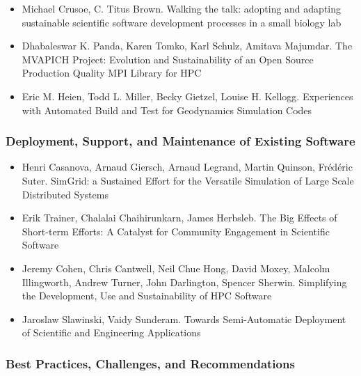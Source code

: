 \documentclass[11pt, oneside]{amsart}
\begin{document}
\begin{itemize}
\item Michael Crusoe, C. Titus Brown. Walking the talk: adopting and
  adapting sustainable scientific software development processes in a
  small biology lab~\cite{Crusoe_WSSSPE}

\item Dhabaleswar K. Panda, Karen Tomko, Karl Schulz, Amitava Majumdar.
The MVAPICH Project: Evolution and Sustainability of an Open Source
Production Quality MPI Library for HPC~\cite{Panda_WSSSPE}

\item Eric M. Heien, Todd L. Miller, Becky Gietzel, Louise
  H. Kellogg. Experiences with Automated Build and Test for
  Geodynamics Simulation Codes~\cite{Heien_WSSSPE}

\end{itemize}

\subsubsection*{Deployment, Support, and Maintenance of Existing Software}

\begin{itemize}

\item Henri Casanova, Arnaud Giersch, Arnaud Legrand, Martin Quinson,
  Fr\'{e}d\'{e}ric Suter. SimGrid: a Sustained Effort for the
  Versatile Simulation of Large Scale Distributed
  Systems~\cite{Casanova_WSSSPE}

\item Erik Trainer, Chalalai Chaihirunkarn, James Herbsleb. The Big
  Effects of Short-term Efforts: A Catalyst for Community Engagement
  in Scientific Software~\cite{Trainer_WSSSPE}

\item Jeremy Cohen, Chris Cantwell, Neil Chue Hong, David Moxey,
  Malcolm Illingworth, Andrew Turner, John Darlington, Spencer
  Sherwin. Simplifying the Development, Use and Sustainability of HPC
  Software~\cite{Cohen_WSSSPE}

\item Jaroslaw Slawinski, Vaidy Sunderam. Towards Semi-Automatic
  Deployment of Scientific and Engineering Applications~\cite{Slawinski_WSSSPE}

\end{itemize}

\subsubsection*{Best Practices, Challenges, and Recommendations}
\end{document}
